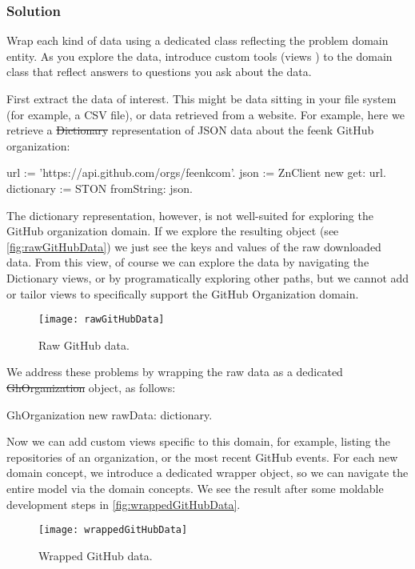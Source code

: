 \documentclass[sigconf]{acmart}
\begin{document}
\subsubsection*{Solution}
Wrap each kind of data using a dedicated class reflecting the problem domain entity.
As you explore the data, introduce custom tools (views \etc) to the domain class that reflect answers to questions you ask about the data.

First extract the data of interest.
This might be data sitting in your file system (for example, a CSV file), or data retrieved from a website.
For example, here we retrieve a \st{Dictionary} representation of JSON data about the feenk GitHub organization:

\begin{code}
url := 'https://api.github.com/orgs/feenkcom'.
json := ZnClient new get: url.
dictionary := STON fromString: json.
\end{code}

The dictionary representation, however, is not well-suited for exploring the GitHub organization domain.
If we explore the resulting object (see \autoref{fig:rawGitHubData}) we just see the keys and values of the raw downloaded data.
From this view, of course we can explore the data by navigating the Dictionary views, or by programatically exploring other paths, but we cannot add or tailor views to specifically support the GitHub Organization domain.

\begin{figure}[h]
  \texttt{[image: rawGitHubData]}
  \caption{Raw GitHub data.}
  \label{fig:rawGitHubData}
\end{figure}

We address these problems by wrapping the raw data as a dedicated \st{GhOrganization} object, as follows:

\begin{code}
GhOrganization new rawData: dictionary.
\end{code}

Now we can add custom views specific to this domain, for example, listing the repositories of an organization, or the most recent GitHub events.
For each new domain concept, we introduce a dedicated wrapper object, so we can navigate the entire model via the domain concepts.
We see the result after some moldable development steps in \autoref{fig:wrappedGitHubData}.

\begin{figure}[h]
  \texttt{[image: wrappedGitHubData]}
  \caption{Wrapped GitHub data.}
  \label{fig:wrappedGitHubData}
\end{figure}
\end{document}
